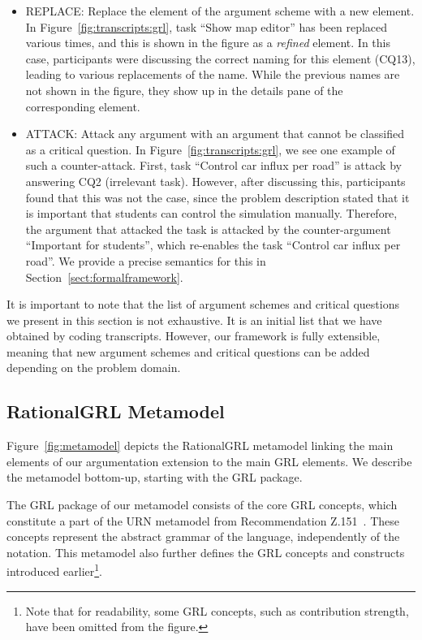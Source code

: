 \begin{itemize}
\item \textsf{REPLACE:} Replace the element of the argument scheme with a new element. In Figure~\ref{fig:transcripts:grl}, task ``Show map editor'' has been replaced various times, and this is shown in the figure as a \emph{refined} element. In this case, participants were discussing the correct naming for this element (CQ13), leading to various replacements of the name. While the previous names are not shown in the figure, they show up in the details pane of the corresponding element. %
\item \textsf{ATTACK:} Attack any argument with an argument that cannot be classified as a critical question. In Figure~\ref{fig:transcripts:grl}, we see one example of such a counter-attack. First, task ``Control car influx per road'' is attack by answering CQ2 (irrelevant task). However, after discussing this, participants found that this was not the case, since the problem description stated that it is important that students can control the simulation manually. Therefore, the argument that attacked the task is attacked by the counter-argument ``Important for students'', which re-enables the task ``Control car influx per road''. We provide a precise semantics for this in Section~\ref{sect:formalframework}.
\end{itemize}

It is important to note that the list of argument schemes and critical questions we present in this section is not exhaustive. It is an initial list that we have obtained by coding transcripts. However, our framework is fully extensible, meaning that new argument schemes and critical questions can be added depending on the problem domain.

\subsection{RationalGRL Metamodel}
\label{sect:metamodel}

Figure~\ref{fig:metamodel} depicts the RationalGRL metamodel linking the main elements of our argumentation extension to the main GRL elements. We describe the metamodel bottom-up, starting with the GRL package.

The GRL package of our metamodel consists of the core GRL concepts, which constitute a part of the URN metamodel from Recommendation Z.151~\cite{URN}. These concepts represent the abstract grammar of the language, independently of the notation. This metamodel also further defines the GRL concepts and constructs introduced earlier\footnote{Note that for readability, some GRL concepts, such as contribution strength, have been omitted from the figure.}.

